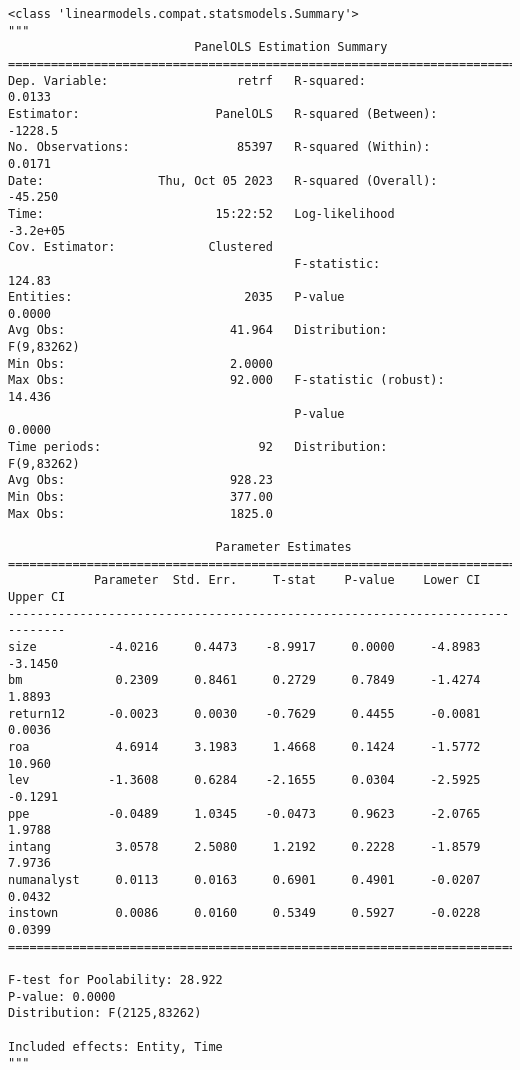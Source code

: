 \documentclass[11pt]{article}
\makeatletter
\newcommand{\boxspacing}{\kern\kvtcb@left@rule\kern\kvtcb@boxsep}
\newcommand{\prompt}[4]{
        {\ttfamily\llap{{\color{#2}[#3]:\hspace{3pt}#4}}\vspace{-\baselineskip}}
    }
\makeatother
\begin{document}
            \begin{tcolorbox}[breakable, size=fbox, boxrule=.5pt, pad at break*=1mm, opacityfill=0]
\prompt{Out}{outcolor}{9}{\boxspacing}
\begin{Verbatim}[commandchars=\\\{\}]
<class 'linearmodels.compat.statsmodels.Summary'>
"""
                          PanelOLS Estimation Summary
================================================================================
Dep. Variable:                  retrf   R-squared:                        0.0133
Estimator:                   PanelOLS   R-squared (Between):             -1228.5
No. Observations:               85397   R-squared (Within):               0.0171
Date:                Thu, Oct 05 2023   R-squared (Overall):             -45.250
Time:                        15:22:52   Log-likelihood                  -3.2e+05
Cov. Estimator:             Clustered
                                        F-statistic:                      124.83
Entities:                        2035   P-value                           0.0000
Avg Obs:                       41.964   Distribution:                 F(9,83262)
Min Obs:                       2.0000
Max Obs:                       92.000   F-statistic (robust):             14.436
                                        P-value                           0.0000
Time periods:                      92   Distribution:                 F(9,83262)
Avg Obs:                       928.23
Min Obs:                       377.00
Max Obs:                       1825.0

                             Parameter Estimates
==============================================================================
            Parameter  Std. Err.     T-stat    P-value    Lower CI    Upper CI
------------------------------------------------------------------------------
size          -4.0216     0.4473    -8.9917     0.0000     -4.8983     -3.1450
bm             0.2309     0.8461     0.2729     0.7849     -1.4274      1.8893
return12      -0.0023     0.0030    -0.7629     0.4455     -0.0081      0.0036
roa            4.6914     3.1983     1.4668     0.1424     -1.5772      10.960
lev           -1.3608     0.6284    -2.1655     0.0304     -2.5925     -0.1291
ppe           -0.0489     1.0345    -0.0473     0.9623     -2.0765      1.9788
intang         3.0578     2.5080     1.2192     0.2228     -1.8579      7.9736
numanalyst     0.0113     0.0163     0.6901     0.4901     -0.0207      0.0432
instown        0.0086     0.0160     0.5349     0.5927     -0.0228      0.0399
==============================================================================

F-test for Poolability: 28.922
P-value: 0.0000
Distribution: F(2125,83262)

Included effects: Entity, Time
"""
\end{Verbatim}
\end{tcolorbox}
        
\end{document}
